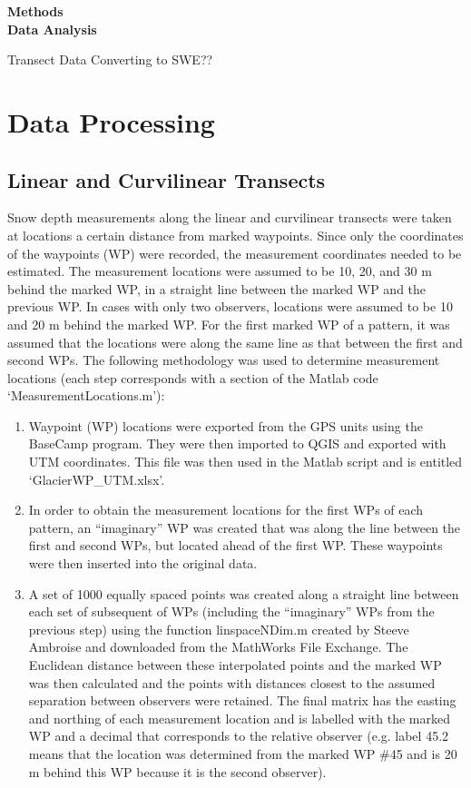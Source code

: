 \documentclass[12pt]{article}
\begin{document}

\begin{center}
\Large \textbf{Methods\\ Data Analysis}
\end{center}


Transect Data
	Converting to SWE??



\section{Data Processing}

\subsection{Linear and Curvilinear Transects}

Snow depth measurements along the linear and curvilinear transects were taken at locations a certain distance from marked waypoints. Since only the coordinates of the waypoints (WP) were recorded, the measurement coordinates needed to be estimated. The measurement locations were assumed to be 10, 20, and 30 m behind the marked WP, in a straight line between the marked WP and the previous WP. In cases with only two observers, locations were assumed to be 10 and 20 m behind the marked WP. For the first marked WP of a pattern, it was assumed that the locations were along the same line as that between the first and second WPs. The following methodology was used to determine measurement locations (each step corresponds with a section of the Matlab code `MeasurementLocations.m'): 
\begin{enumerate}
\item Waypoint (WP) locations were exported from the GPS units using the BaseCamp program. They were then imported to QGIS and exported with UTM coordinates. This file was then used in the Matlab script and is entitled `GlacierWP\_UTM.xlsx'. 
\item In order to obtain the measurement locations for the first WPs of each pattern, an ``imaginary'' WP was created that was along the line between the first and second WPs, but located ahead of the first WP. These waypoints were then inserted into the original data. 
\item A set of 1000 equally spaced points was created along a straight line between each set of subsequent of WPs (including the ``imaginary'' WPs from the previous step) using the function linspaceNDim.m created by Steeve Ambroise and downloaded from the MathWorks File Exchange. The Euclidean distance between these interpolated points and the marked WP was then calculated and the points with distances closest to the assumed separation between observers were retained. The final matrix has the easting and northing of each measurement location and is labelled with the marked WP and a decimal that corresponds to the relative observer (e.g. label 45.2 means that the location was determined from the marked WP \#45 and is 20 m behind this WP because it is the second observer). 
\end{enumerate}
\end{document}
